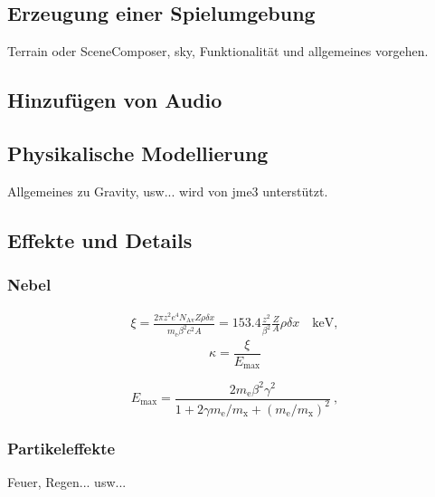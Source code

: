 \subsection{Erzeugung einer Spielumgebung}
Terrain oder SceneComposer, sky, 
Funktionalität und allgemeines vorgehen.

\subsection{Hinzufügen von Audio}

\subsection{Physikalische Modellierung}
Allgemeines zu Gravity, usw... wird von jme3 unterstützt.

\subsection{Effekte und Details}

\subsubsection{Nebel}
\begin{eqnarray*} \xi  = \frac{2\pi z^2 e^4 N_{\textrm{Av}} Z \rho
		\delta x}{m_{\textrm{e}} \beta^2 c^2 A} =  153.4 \frac{z^2}{\beta^2}
	\frac{Z}{A}
	\rho \delta x \quad\textrm{keV},
\end{eqnarray*}
\bigskip
\begin{equation}
\kappa =\frac{\xi}{E_{\textrm{max}}} %
\end{equation}


\[
E_{\textrm{max}} =\frac{2 m_{\textrm{e}} \beta^2\gamma^2 }{1 +
	2\gamma m_{\textrm{e}}/m_{\textrm{x}} + \left ( m_{\textrm{e}}
	/m_{\textrm{x}}\right)^2}\ ,
\]

\subsubsection{Partikeleffekte}
Feuer, Regen... usw...


